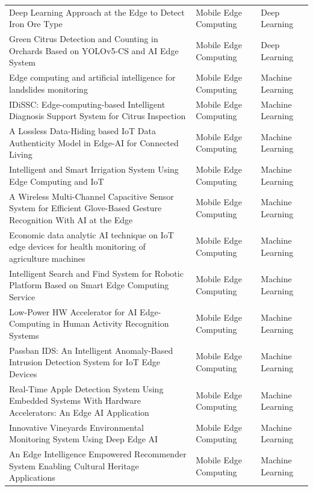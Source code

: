 \begin{table}[h!]
{\begin{tabular}{lll}
Deep Learning Approach at the Edge to Detect Iron Ore Type \cite{klippel2021deep} & Mobile Edge Computing & Deep Learning \\
Green Citrus Detection and Counting in Orchards Based on YOLOv5-CS and AI Edge System \cite{lyu2022green} & Mobile Edge Computing & Deep Learning \\ \hline
Edge computing and artificial intelligence for landslides monitoring \cite{elmoulat2020edge} & Mobile Edge Computing & Machine Learning \\
IDiSSC: Edge-computing-based Intelligent Diagnosis Support System for Citrus Inspection \cite{iceis21orange} & Mobile Edge Computing & Machine Learning \\
A Lossless Data-Hiding based IoT Data Authenticity Model in Edge-AI for Connected Living \cite{rahman2021lossless} & Mobile Edge Computing & Machine Learning \\
Intelligent and Smart Irrigation System Using Edge Computing and IoT \cite{munir2021intelligent} & Mobile Edge Computing & Machine Learning \\
A Wireless Multi-Channel Capacitive Sensor System for Efficient Glove-Based Gesture Recognition With AI at the Edge \cite{pan2020wireless} & Mobile Edge Computing & Machine Learning \\
Economic data analytic AI technique on IoT edge devices for health monitoring of agriculture machines \cite{gupta2020economic} & Mobile Edge Computing & Machine Learning \\
Intelligent Search and Find System for Robotic Platform Based on Smart Edge Computing Service \cite{barnawi2020intelligent} & Mobile Edge Computing & Machine Learning \\
Low-Power HW Accelerator for AI Edge-Computing in Human Activity Recognition Systems \cite{de2020low} & Mobile Edge Computing & Machine Learning \\
Passban IDS: An Intelligent Anomaly-Based Intrusion Detection System for IoT Edge Devices \cite{eskandari2020passban} & Mobile Edge Computing & Machine Learning \\
Real-Time Apple Detection System Using Embedded Systems With Hardware Accelerators: An Edge AI Application \cite{mazzia2020real} & Mobile Edge Computing & Machine Learning \\
Innovative Vineyards Environmental Monitoring System Using Deep Edge AI \cite{coppola2021innovative} & Mobile Edge Computing & Machine Learning \\
An Edge Intelligence Empowered Recommender System Enabling Cultural Heritage Applications \cite{su2019edge} & Mobile Edge Computing & Machine Learning \\ \hline

\end{tabular}}
\end{table}
